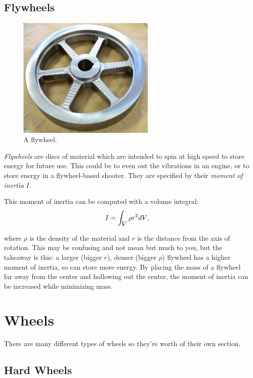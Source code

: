 	\subsection{Flywheels}
	\begin{figure}[H]
		\includegraphics[width=0.6\textwidth]{imgs/flywheel.jpeg}
		\caption{A flywheel.}
	\end{figure}
	\textit{Flywheels} are discs of material which are intended to spin at high speed to store energy for future use. This could be to even out the vibrations in an engine, or to store energy in a flywheel-based shooter. They are specified by their \textit{moment of inertia} $I$. 
	
	This moment of inertia can be computed with a volume integral:
	\begin{align}
		I = \int_{\volume} \rho r^2 d \volume ,
	\end{align}
	
	where $\rho$ is the density of the material and $r$ is the distance from the axis of rotation. This may be confusing and not mean but much to you, but the takeaway is this: a larger (bigger $r$), denser (bigger $\rho$) flywheel has a higher moment of inertia, so can store more energy. By placing the mass of a flywheel far away from the center and hollowing out the center, the moment of inertia can be increased while minimizing mass.	
	
	
\section{Wheels} \label{section:wheels} 
	There are many different types of wheels so they're worth of their own section.
	
	\subsection{Hard Wheels}
	
